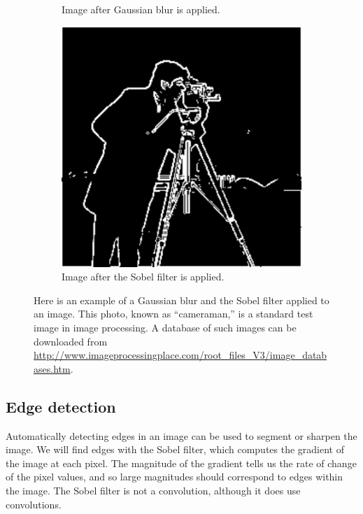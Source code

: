 \begin{figure}
\begin{subfigure}[b]{.49\textwidth}
\caption{Image after Gaussian blur is applied.}
\label{fig:cameraman_blur}
\end{subfigure}
\begin{subfigure}[b]{.49\textwidth}
\centering
\includegraphics[width=\textwidth]{edges.pdf}
\caption{Image after the Sobel filter is applied.}
\label{fig:cameraman_edges}
\end{subfigure}
\caption{Here is an example of a Gaussian blur and the Sobel filter applied to an image. 
This photo, known as ``cameraman,'' is a standard test image in image processing. 
A database of such images can be downloaded from \url{http://www.imageprocessingplace.com/root_files_V3/image_databases.htm}.}
\label{fig:cameraman1}
\end{figure}



\subsection*{Edge detection}

Automatically detecting edges in an image can be used to segment or sharpen the image. 
We will find edges with the Sobel filter, which computes the gradient of the image at each pixel. 
The magnitude of the gradient tells us the rate of change of the pixel values, and so large magnitudes should
correspond to edges within the image. 
The Sobel filter is not a convolution, although it does use convolutions.

